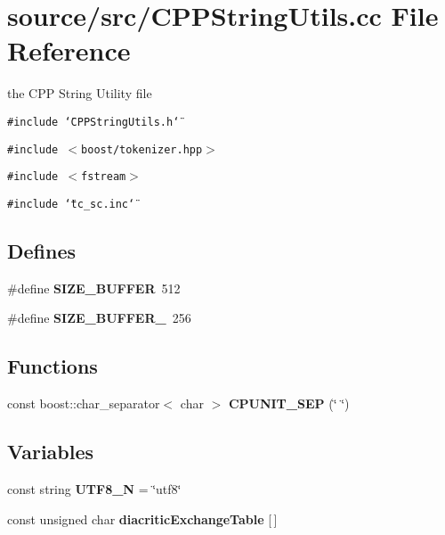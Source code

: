 \section{source/src/CPPStringUtils.cc File Reference}
\label{CPPStringUtils_8cc}
the CPP String Utility file  


{\tt \#include \char`\"{}CPPStringUtils.h\char`\"{}}\par
{\tt \#include $<$boost/tokenizer.hpp$>$}\par
{\tt \#include $<$fstream$>$}\par
{\tt \#include \char`\"{}tc\_\-sc.inc\char`\"{}}\par
\subsection*{Defines}
\begin{CompactItemize}
\item 
\#define \textbf{SIZE\_\-BUFFER}~512\label{CPPStringUtils_8cc_4dea39042071768c1e115b0ebbfc52f2}

\item 
\#define \textbf{SIZE\_\-BUFFER\_}~256\label{CPPStringUtils_8cc_a4577a3eb0be47804f1ec7e20554d163}

\end{CompactItemize}
\subsection*{Functions}
\begin{CompactItemize}
\item 
const boost::char\_\-separator$<$ char $>$ \textbf{CPUNIT\_\-SEP} (\char`\"{} \char`\"{})\label{CPPStringUtils_8cc_704b52ee55bfc9528ac9a84441848f09}

\end{CompactItemize}
\subsection*{Variables}
\begin{CompactItemize}
\item 
const string \textbf{UTF8\_\-N} = \char`\"{}utf8\char`\"{}\label{CPPStringUtils_8cc_4b94e31764062d505344847ad696ac2c}

\item 
const unsigned char \textbf{diacriticExchangeTable} [$\,$]
\end{CompactItemize}


